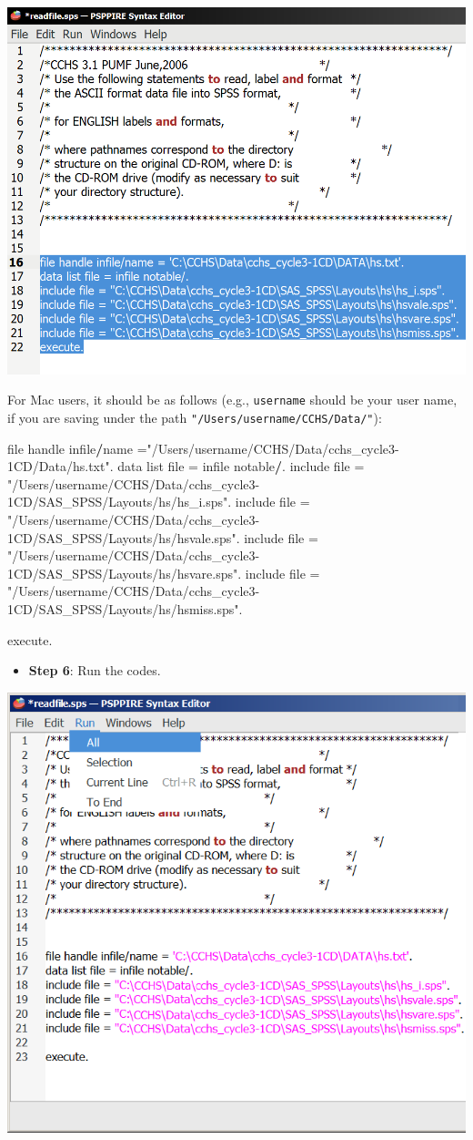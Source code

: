 \documentclass[
]{book}
\newenvironment{Shaded}{\begin{snugshade}}{\end{snugshade}}
\newcommand{\NormalTok}[1]{#1}
\newcommand{\OperatorTok}[1]{\textcolor[rgb]{0.81,0.36,0.00}{\textbf{#1}}}
\newcommand{\StringTok}[1]{\textcolor[rgb]{0.31,0.60,0.02}{#1}}
\providecommand{\tightlist}{%
  \setlength{\itemsep}{0pt}\setlength{\parskip}{0pt}}
\begin{document}
\includegraphics[width=0.65\linewidth]{images/abacusX34}

For Mac users, it should be as follows (e.g., \texttt{username} should be your user name, if you are saving under the path \texttt{"/Users/username/CCHS/Data/"}):

\begin{Shaded}
\begin{Highlighting}[]
\NormalTok{file handle infile}\OperatorTok{/}\NormalTok{name =}\StringTok{"/Users/username/CCHS/Data/cchs_cycle3-1CD/Data/hs.txt"}\NormalTok{.}
\NormalTok{data list file =}\StringTok{ }\NormalTok{infile notable}\OperatorTok{/}\NormalTok{.}
\NormalTok{include file =}\StringTok{ "/Users/username/CCHS/Data/cchs_cycle3-1CD/SAS_SPSS/Layouts/hs/hs_i.sps"}\NormalTok{.}
\NormalTok{include file =}\StringTok{ "/Users/username/CCHS/Data/cchs_cycle3-1CD/SAS_SPSS/Layouts/hs/hsvale.sps"}\NormalTok{.}
\NormalTok{include file =}\StringTok{ "/Users/username/CCHS/Data/cchs_cycle3-1CD/SAS_SPSS/Layouts/hs/hsvare.sps"}\NormalTok{.}
\NormalTok{include file =}\StringTok{ "/Users/username/CCHS/Data/cchs_cycle3-1CD/SAS_SPSS/Layouts/hs/hsmiss.sps"}\NormalTok{.}

\NormalTok{execute.}
\end{Highlighting}
\end{Shaded}

\begin{itemize}
\tightlist
\item
  \textbf{Step 6}: Run the codes.
\end{itemize}

\includegraphics[width=0.65\linewidth]{images/abacus35}
\end{document}

